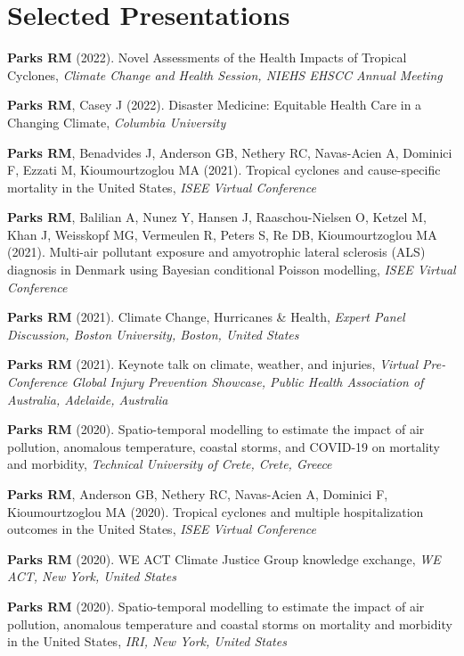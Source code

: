 \section*{Selected Presentations}

\noindent \textbf{Parks RM} (2022). Novel Assessments of the Health Impacts of Tropical Cyclones, \textit{Climate Change and Health Session, NIEHS EHSCC Annual Meeting} \bigskip

\noindent \textbf{Parks RM}, Casey J (2022). Disaster Medicine: Equitable Health Care in a Changing Climate, \textit{Columbia University} \bigskip

\noindent \textbf{Parks RM}, Benadvides J, Anderson GB, Nethery RC, Navas-Acien A, Dominici F, Ezzati M, Kioumourtzoglou MA (2021). Tropical cyclones and cause-specific mortality in the United States, \textit{ISEE Virtual Conference} \bigskip

\noindent \textbf{Parks RM}, Balilian A, Nunez Y, Hansen J, Raaschou-Nielsen O, Ketzel M, Khan J, Weisskopf MG, Vermeulen R, Peters S, Re DB, Kioumourtzoglou MA (2021). Multi-air pollutant exposure and amyotrophic lateral sclerosis (ALS) diagnosis in Denmark using Bayesian conditional Poisson modelling, \textit{ISEE Virtual Conference} \bigskip

\noindent \textbf{Parks RM} (2021). Climate Change, Hurricanes \& Health,  \textit{Expert Panel Discussion, Boston University, Boston, United States} \bigskip

\noindent \textbf{Parks RM} (2021). Keynote talk on climate, weather, and injuries,  \textit{Virtual Pre-Conference Global Injury Prevention Showcase, Public Health Association of Australia, Adelaide, Australia} \bigskip

\noindent \textbf{Parks RM} (2020). Spatio-temporal modelling to estimate the impact of air pollution, anomalous temperature, coastal storms, and COVID-19 on mortality and morbidity,  \textit{Technical University of Crete, Crete, Greece} \bigskip

\noindent \textbf{Parks RM}, Anderson GB, Nethery RC, Navas-Acien A, Dominici F, Kioumourtzoglou MA (2020). Tropical cyclones and multiple hospitalization outcomes in the United States, \textit{ISEE Virtual Conference} \bigskip

\noindent \textbf{Parks RM} (2020). WE ACT Climate Justice Group knowledge exchange, \textit{WE ACT, New York, United States} \bigskip

\noindent \textbf{Parks RM} (2020). Spatio-temporal modelling to estimate the impact of air pollution, anomalous temperature and coastal storms on mortality and morbidity in the United States,  \textit{IRI, New York, United States} \bigskip

